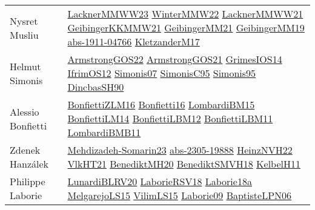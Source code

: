 {\begin{longtable}{p{4cm}p{20cm}}
Nysret Musliu & \href{articles/LacknerMMWW23.pdf}{LacknerMMWW23}\cite{LacknerMMWW23} \href{papers/WinterMMW22.pdf}{WinterMMW22}\cite{WinterMMW22} \href{papers/LacknerMMWW21.pdf}{LacknerMMWW21}\cite{LacknerMMWW21} \href{papers/GeibingerKKMMW21.pdf}{GeibingerKKMMW21}\cite{GeibingerKKMMW21} \href{papers/GeibingerMM21.pdf}{GeibingerMM21}\cite{GeibingerMM21} \href{papers/GeibingerMM19.pdf}{GeibingerMM19}\cite{GeibingerMM19} \href{articles/abs-1911-04766.pdf}{abs-1911-04766}\cite{abs-1911-04766} \href{papers/KletzanderM17.pdf}{KletzanderM17}\cite{KletzanderM17} \\
Helmut Simonis & \href{papers/ArmstrongGOS22.pdf}{ArmstrongGOS22}\cite{ArmstrongGOS22} \href{papers/ArmstrongGOS21.pdf}{ArmstrongGOS21}\cite{ArmstrongGOS21} \href{articles/GrimesIOS14.pdf}{GrimesIOS14}\cite{GrimesIOS14} \href{papers/IfrimOS12.pdf}{IfrimOS12}\cite{IfrimOS12} \href{articles/Simonis07.pdf}{Simonis07}\cite{Simonis07} \href{papers/SimonisC95.pdf}{SimonisC95}\cite{SimonisC95} \href{papers/Simonis95.pdf}{Simonis95}\cite{Simonis95} \href{articles/DincbasSH90.pdf}{DincbasSH90}\cite{DincbasSH90} \\
Alessio Bonfietti & \href{papers/BonfiettiZLM16.pdf}{BonfiettiZLM16}\cite{BonfiettiZLM16} \href{}{Bonfietti16}\cite{Bonfietti16} \href{papers/LombardiBM15.pdf}{LombardiBM15}\cite{LombardiBM15} \href{papers/BonfiettiLM14.pdf}{BonfiettiLM14}\cite{BonfiettiLM14} \href{papers/BonfiettiLBM12.pdf}{BonfiettiLBM12}\cite{BonfiettiLBM12} \href{papers/BonfiettiLBM11.pdf}{BonfiettiLBM11}\cite{BonfiettiLBM11} \href{papers/LombardiBMB11.pdf}{LombardiBMB11}\cite{LombardiBMB11} \\
Zdenek Hanz{\'{a}}lek & \href{papers/Mehdizadeh-Somarin23.pdf}{Mehdizadeh-Somarin23}\cite{Mehdizadeh-Somarin23} \href{articles/abs-2305-19888.pdf}{abs-2305-19888}\cite{abs-2305-19888} \href{articles/HeinzNVH22.pdf}{HeinzNVH22}\cite{HeinzNVH22} \href{articles/VlkHT21.pdf}{VlkHT21}\cite{VlkHT21} \href{articles/BenediktMH20.pdf}{BenediktMH20}\cite{BenediktMH20} \href{papers/BenediktSMVH18.pdf}{BenediktSMVH18}\cite{BenediktSMVH18} \href{articles/KelbelH11.pdf}{KelbelH11}\cite{KelbelH11} \\
Philippe Laborie & \href{articles/LunardiBLRV20.pdf}{LunardiBLRV20}\cite{LunardiBLRV20} \href{articles/LaborieRSV18.pdf}{LaborieRSV18}\cite{LaborieRSV18} \href{papers/Laborie18a.pdf}{Laborie18a}\cite{Laborie18a} \href{papers/MelgarejoLS15.pdf}{MelgarejoLS15}\cite{MelgarejoLS15} \href{papers/VilimLS15.pdf}{VilimLS15}\cite{VilimLS15} \href{papers/Laborie09.pdf}{Laborie09}\cite{Laborie09} \href{}{BaptisteLPN06}\cite{BaptisteLPN06} \\

\end{longtable}}

